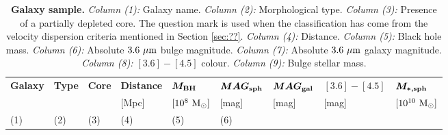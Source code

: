 \begin{table*}                                        
\small                                                
\begin{center}                                        
\caption{{\bf Galaxy sample.}                        
\emph{Column (1):} Galaxy name.                       
\emph{Column (2):} Morphological type.                       
\emph{Column (3):} Presence of a partially depleted core. 			The question mark is used when the classification has come from the velocity dispersion criteria mentioned in Section \ref{sec:??}.   
\emph{Column (4):} Distance.                                   
\emph{Column (5):} Black hole mass.                                   
\emph{Column (6):} Absolute $3.6\rm~\mu m$ bulge magnitude.                                   
\emph{Column (7):} Absolute $3.6\rm~\mu m$ galaxy magnitude.                                   
\emph{Column (8):} $[3.6]-[4.5]$ colour.                                   
\emph{Column (9):} Bulge stellar mass. }                      
\begin{tabular}{lllllllll}                           
\hline                                                
\multicolumn{1}{l}{{\bf Galaxy}} &                   
\multicolumn{1}{l}{{\bf Type}} &                     
\multicolumn{1}{l}{{\bf Core}} &                     
\multicolumn{1}{l}{{\bf Distance}} &                 
\multicolumn{1}{l}{{\bf $\bm{M_{\rm BH}}$}} &  
\multicolumn{1}{l}{{\bf $\bm{MAG_{\rm sph}}$}} &  
\multicolumn{1}{l}{{\bf $\bm{MAG_{\rm gal}}$}} &  
\multicolumn{1}{l}{{\bf $\bm{[3.6]-[4.5]}$}} &  
\multicolumn{1}{l}{{\bf $\bm{M_{\rm *,sph}}$}} \\  
\multicolumn{1}{l}{} &                                
\multicolumn{1}{l}{} &                                
\multicolumn{1}{l}{} &                                
\multicolumn{1}{l}{[Mpc]} &                           
\multicolumn{1}{l}{$[10^8~\rm M_{\odot}]$} &         
\multicolumn{1}{l}{[mag]} &                                
\multicolumn{1}{l}{[mag]} &                                
\multicolumn{1}{l}{[mag]} &                                
\multicolumn{1}{l}{$[10^{10}~\rm M_{\odot}]$} \\                             
\multicolumn{1}{l}{(1)} &                             
\multicolumn{1}{l}{(2)} &                             
\multicolumn{1}{l}{(3)} &                             
\multicolumn{1}{l}{(4)} &                             
\multicolumn{1}{l}{(5)} &                             
\multicolumn{1}{l}{(6)} &                             

\end{tabular}
\end{center}
\end{table*}
